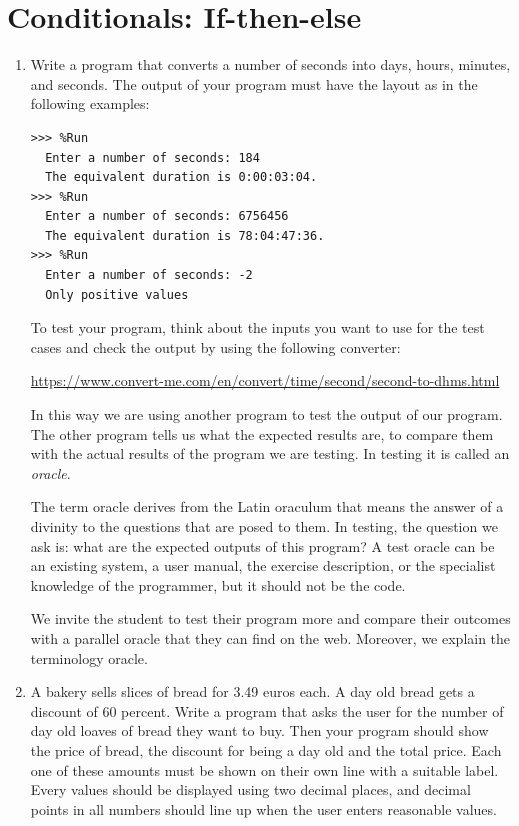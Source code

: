 \documentclass[
  fontsize=10pt,
  a4paper,
]{scrartcl}
\newenvironment{howTILEd}%
  {\begin{mdframed}[skipabove=10pt,skipbelow=10pt,backgroundcolor=pink!40]}%
  {\end{mdframed}}
\begin{document}
\hypertarget{boletin3}{%
\section{Conditionals: If-then-else}\label{section.if-then-else}}

\begin{enumerate}

\item Write a program that converts a number of seconds into days, hours, minutes, and seconds. The output of your program must have the layout as in the following examples:

\begin{small}
\begin{Verbatim}[frame=single, label={\em examples of test executions}]
>>> %Run 
  Enter a number of seconds: 184
  The equivalent duration is 0:00:03:04.
>>> %Run 
  Enter a number of seconds: 6756456
  The equivalent duration is 78:04:47:36.
>>> %Run 
  Enter a number of seconds: -2
  Only positive values
\end{Verbatim}
\end{small}
To test your program, think about the inputs you want to use for the test cases and check the output by using the following converter:

{\small \url{https://www.convert-me.com/en/convert/time/second/second-to-dhms.html}}

In this way we are using another program to test the output of our program. The other program tells us what the expected results are, to compare them with the actual results of the program we are testing. In testing it is called an {\em oracle}.

The term oracle derives from the Latin oraculum that means the answer of a divinity to the questions that are posed to them. In testing, the question we ask is: what are the expected outputs of this program?
%
A test oracle can be an existing system, a user manual, the exercise description, or the specialist knowledge of the programmer, but it should not be the code.

\begin{howTILEd}
We invite the student to test their program more and compare their outcomes with a parallel oracle that they can find on the web. Moreover, we explain the terminology oracle.
\end{howTILEd}


\item A bakery sells slices of bread for 3.49 euros each. A day old bread gets a discount of 60 percent.
%
Write a program that asks the user for the number of day old loaves of bread they want to buy. Then your program should show the price of bread, the discount for being a day old and the total price. Each one of these amounts must be shown on their own line with a suitable label. Every values should be displayed using two decimal places, and decimal points in
all numbers should line up when the user enters reasonable values.


\end{enumerate}
\end{document}
